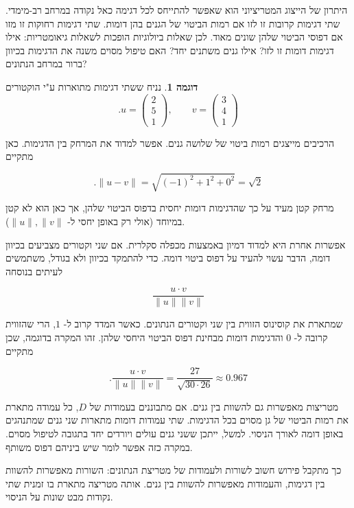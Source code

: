 \documentclass[12pt]{report}
\theoremstyle{plain}
\theoremstyle{definition}
\newtheorem{example}{דוגמה}[chapter]
\newcommand{\0}{\mathbf{0}}
\begin{document}
היתרון של הייצוג המטריציוני הוא שאפשר להתייחס לכל דגימה כאל נקודה במרחב רב-מימדי. שתי דגימות קרובות זו לזו אם רמות הביטוי של הגנים בהן דומות. שתי דגימות רחוקות זו מזו אם דפוסי הביטוי שלהן שונים מאוד.
לכן שאלות ביולוגיות הופכות לשאלות גיאומטריות: אילו דגימות דומות זו לזו? אילו גנים משתנים יחד? האם טיפול מסוים משנה את הדגימות בכיוון ברור במרחב הנתונים?

\begin{example}
נניח ששתי דגימות מתוארות ע"י הוקטורים
$$
.u =
\begin{pmatrix}
2 \\
5 \\
1
\end{pmatrix},
\qquad
v =
\begin{pmatrix}
3 \\
4 \\
1
\end{pmatrix}
$$

הרכיבים מייצגים רמות ביטוי של שלושה גנים.
אפשר למדוד את המרחק בין הדגימות. כאן מתקיים

$$
.\|u-v\|=\sqrt{(-1)^2+1^2+0^2}=\sqrt{2}
$$

מרחק קטן מעיד על כך שהדגימות דומות יחסית בדפוס הביטוי שלהן, אך כאן הוא לא קטן במיוחד (אולי רק באופן יחסי ל-
$\|u\|,\|v\|$).

אפשרות אחרת היא למדוד דמיון באמצעות מכפלה סקלרית.
אם שני וקטורים מצביעים בכיוון דומה, הדבר עשוי להעיד על דפוס ביטוי דומה.
כדי להתמקד בכיוון ולא בגודל, משתמשים לעיתים בנוסחה

$$
\frac{u\cdot v}{\|u\|\|v\|}
$$

שמתארת את קוסינוס הזווית בין שני וקטורים הנתונים.
כאשר המדד קרוב ל-
$1$,
הרי שהזווית קרובה ל-
$0$
והדגימות דומות מבחינת דפוס הביטוי היחסי שלהן. זהו המקרה בדוגמה, שכן מתקיים

$$
.\frac{u\cdot v}{\|u\|\|v\|}=\frac{27}{\sqrt{30\cdot 26}}\approx 0.967
$$

\end{example}

מטריצות מאפשרות גם להשוות בין גנים. אם מתבוננים בעמודות של
$D$,
כל עמודה מתארת את רמות הביטוי של גן מסוים בכל הדגימות. שתי עמודות דומות מתארות שני גנים שמתנהגים באופן דומה לאורך הניסוי. למשל, ייתכן ששני גנים עולים ויורדים יחד בתגובה לטיפול מסוים.
במקרה כזה אפשר לומר שיש ביניהם דפוס משותף.

כך מתקבל פירוש חשוב לשורות ולעמודות של מטריצת הנתונים:
השורות מאפשרות להשוות בין דגימות, והעמודות מאפשרות להשוות בין גנים.
אותה מטריצה מתארת בו זמנית שתי נקודות מבט שונות על הניסוי.
\end{document}
